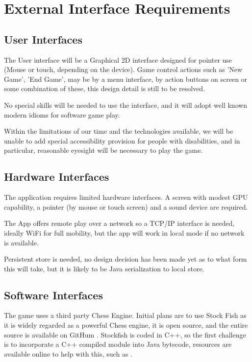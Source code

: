 \documentclass[a4paper,10pt]{article}
\begin{document}
\section{External Interface Requirements}
\subsection{User Interfaces}

The User interface will be a Graphical 2D interface designed for pointer use (Mouse or touch, depending on the device). Game control actions such as 'New Game', 'End Game', may be by a menu interface, by action buttons on screen or some combination of these, this design detail is still to be resolved. 

No special skills will be needed to use the interface, and it will adopt well known modern idioms for software game play.

Within the limitations of our time and the technologies available, we will be unable to add special accessibility provision for people with disabilities, and in particular, reasonable eyesight will be necessary to play the game. 

\subsection{Hardware Interfaces}

The application requires limited hardware interfaces. A screen with modest GPU capability, a pointer (by mouse or touch screen) and a sound device are required. 

The App offers remote play over a network so a TCP/IP interface  is needed, ideally WiFi for full mobility, but the app will work in local mode if no network is available. 

Persistent store is needed, no design decision has been made yet as to what form this will take, but it is likely to be Java serialization to local store. 

\subsection{Software Interfaces}


The game uses a third party Chess Engine. Initial plans are to use Stock Fish \cite{stockfish}
as it is widely regarded as a powerful Chess engine, it is open source, and the entire source is available on GitHum \cite{stockfish-github}. Stockfish is coded in C++, so the first challenge is to incorporate a C++ compiled module into Java bytecode, resources are available online to help with this, such as \cite{javaStockfish}. 
\end{document}
